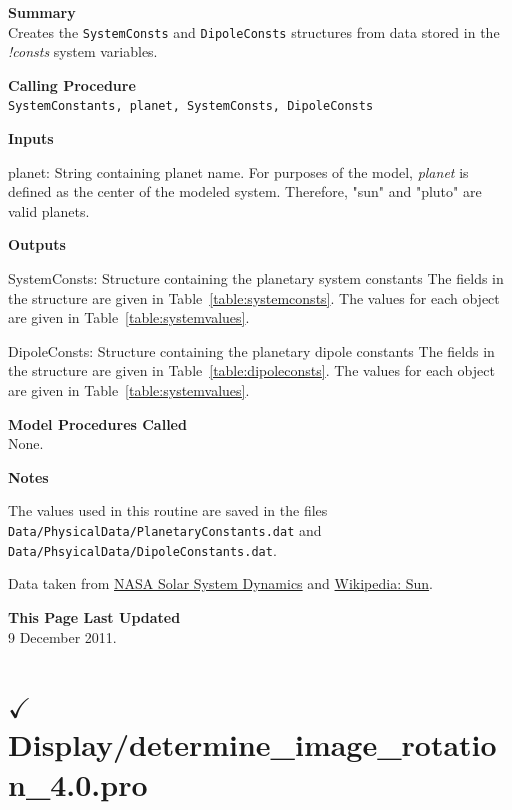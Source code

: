 \documentclass[11pt]{article}
\newcommand\descrip[1]{\textsf{\textbf{\large{#1}}}\\}
\begin{document}
\descrip{Summary} 
Creates the \texttt{SystemConsts} and \texttt{DipoleConsts} structures from 
data stored in the \textit{!consts} system variables.

\descrip{Calling Procedure}
\verb+SystemConstants, planet, SystemConsts, DipoleConsts+

\descrip{Inputs} 
\begin{compactitem} \listup
\item planet: String containing planet name. For purposes of the model,
\textit{planet} is defined as the center of the modeled system.
Therefore, "sun" and "pluto" are valid planets.
\end{compactitem}

\descrip{Outputs}
\begin{compactitem} \listup
\item SystemConsts: Structure containing the planetary system constants
The fields in the structure are given in Table~\ref{table:systemconsts}. The
values for each object are given in Table~\ref{table:systemvalues}.

\item DipoleConsts: Structure containing the planetary dipole constants 
The fields in the structure are given in Table~\ref{table:dipoleconsts}. 
The values for each object are given in Table~\ref{table:systemvalues}.
\end{compactitem}

\descrip{Model Procedures Called}
None.

\descrip{Notes}
\begin{compactenum} \listup
\item The values used in this routine are saved in the files 
\texttt{Data/PhysicalData/PlanetaryConstants.dat} and 
\texttt{Data/PhsyicalData/DipoleConstants.dat}. 
\item Data taken from 
\href{http://ssd.jpl.nasa.gov/?phys_data}{NASA Solar System Dynamics} and 
\href{http://en.wikipedia.org/wiki/Sun}{Wikipedia: Sun}.
\end{compactenum}

\descrip{This Page Last Updated}
9 December 2011.


\clearpage

\section{$\checkmark$Display/determine\_image\_rotation\_4.0.pro}
\label{sec:determine_image_rotation}
\end{document}
